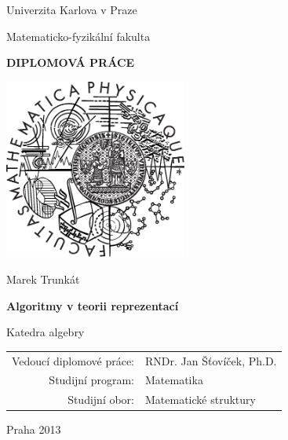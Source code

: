 \thispagestyle{empty}
\begin{center}

\large

Univerzita Karlova v Praze

\medskip

Matematicko-fyzikální fakulta

\vfill

{\bf\Large DIPLOMOVÁ PRÁCE}

\vfill

\centerline{\mbox{\includegraphics[width=60mm]{logo.eps}}}

\vfill
\vspace{5mm}

{\LARGE Marek Trunkát}

\vspace{15mm}

{\LARGE\bfseries Algoritmy v teorii reprezentací}

\vfill

Katedra algebry

\vfill

\begin{tabular}{rl}

Vedoucí diplomové práce: & RNDr. Jan Šťovíček, Ph.D. \\
\noalign{\vspace{2mm}}
Studijní program: & Matematika \\
\noalign{\vspace{2mm}}
Studijní obor: & Matematické struktury \\
\end{tabular}

\vfill

Praha 2013

\end{center}